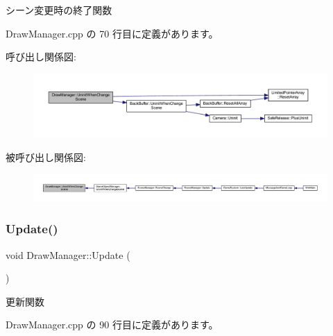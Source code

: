 シーン変更時の終了関数 



 Draw\+Manager.\+cpp の 70 行目に定義があります。

呼び出し関係図\+:
\nopagebreak
\begin{figure}[H]
\begin{center}
\leavevmode
\includegraphics[width=350pt]{class_draw_manager_a8b4ea38d625efbcc08d9b168cb5465f9_cgraph}
\end{center}
\end{figure}
被呼び出し関係図\+:
\nopagebreak
\begin{figure}[H]
\begin{center}
\leavevmode
\includegraphics[width=350pt]{class_draw_manager_a8b4ea38d625efbcc08d9b168cb5465f9_icgraph}
\end{center}
\end{figure}
\mbox{\label{class_draw_manager_af498c44ff698bf3ef473df970e24c917}} 
\subsubsection{\texorpdfstring{Update()}{Update()}}
{\footnotesize\ttfamily void Draw\+Manager\+::\+Update (\begin{DoxyParamCaption}{ }\end{DoxyParamCaption})}



更新関数 



 Draw\+Manager.\+cpp の 90 行目に定義があります。

